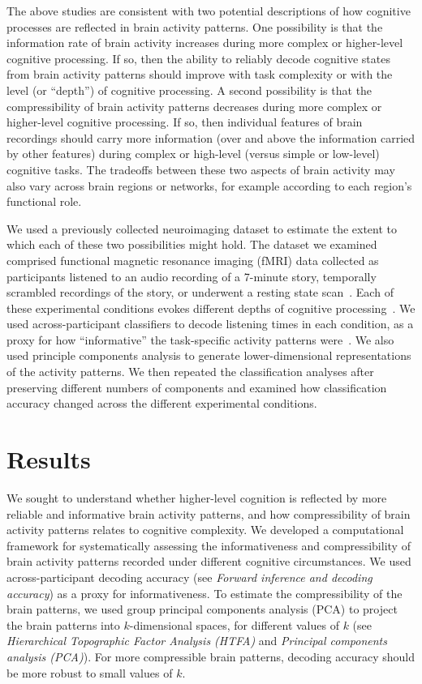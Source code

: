 \documentclass[english, 11pt]{article}
\begin{document}
The above studies are consistent with two potential descriptions of how
cognitive processes are reflected in brain activity patterns. One possibility
is that the information rate of brain activity increases during more complex or
higher-level cognitive processing. If so, then the ability to reliably decode
cognitive states from brain activity patterns should improve with task
complexity or with the level (or ``depth'') of cognitive processing. A second
possibility is that the compressibility of brain activity patterns decreases
during more complex or higher-level cognitive processing. If so, then
individual features of brain recordings should carry more information (over and
above the information carried by other features) during complex or high-level
(versus simple or low-level) cognitive tasks. The tradeoffs between these two
aspects of brain activity may also vary across brain regions or networks, for
example according to each region's functional role.

We used a previously collected neuroimaging dataset to estimate the extent to
which each of these two possibilities might hold. The dataset we examined
comprised functional magnetic resonance imaging (fMRI) data collected as
participants listened to an audio recording of a 7-minute story, temporally
scrambled recordings of the story, or underwent a resting state
scan~\citep{SimoEtal16}. Each of these experimental conditions evokes different
depths of cognitive processing~\citep{SimoEtal16,LernEtal11,
HassEtal08,OwenEtal21}. We used across-participant classifiers to decode
listening times in each condition, as a proxy for how ``informative'' the
task-specific activity patterns were~\citep{SimoChan20}. We also used principle
components analysis to generate lower-dimensional representations of the
activity patterns. We then repeated the classification analyses after
preserving different numbers of components and examined how classification
accuracy changed across the different experimental conditions.



\section*{Results}

We sought to understand whether higher-level cognition is reflected by more
reliable and informative brain activity patterns, and how compressibility of
brain activity patterns relates to cognitive complexity. We developed a
computational framework for systematically assessing the informativeness and
compressibility of brain activity patterns recorded under different cognitive
circumstances. We used across-participant decoding accuracy (see
\textit{Forward inference and decoding accuracy}) as a proxy for
informativeness. To estimate the compressibility of the brain patterns, we used
group principal components analysis (PCA) to project the brain patterns into
$k$-dimensional spaces, for different values of $k$ (see \textit{Hierarchical
Topographic Factor Analysis (HTFA)} and \textit{Principal components analysis
(PCA)}). For more compressible brain patterns, decoding accuracy should be more
robust to small values of $k$.
\end{document}
